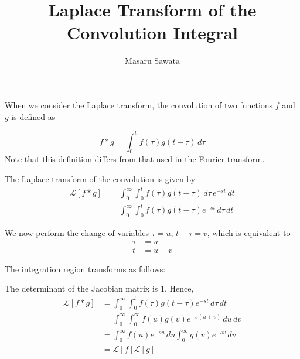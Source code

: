 \documentclass[letterpaper, 12pt]{article}
\title{Laplace Transform of the Convolution Integral}
\author{Masaru Sawata}
\theoremstyle{custom}
\begin{document}
\maketitle
When we consider the Laplace transform, the convolution of two functions $f$ and $g$ is defined as

\begin{equation*}
  f*g = \int_{0}^{t} f(\tau) g(t - \tau) \, d\tau
\end{equation*}
Note that this definition differs from that used in the Fourier transform.

The Laplace transform of the convolution is given by
\begin{align*}
  \mathcal{L} \left[ f*g \right] 
  &= \int_{0}^{\infty} \int_{0}^{t} f(\tau) g(t-\tau) \, d\tau \, e^{-st} \, dt \\
  &= \int_{0}^{\infty} \int_{0}^{t} f(\tau) g(t-\tau) e^{-st} \, d\tau  \, dt
\end{align*}

We now perform the change of variables $\tau = u$, $t - \tau = v$,
which is equivalent to
\begin{align*}
  \tau &= u \\
  t &= u + v
\end{align*}

The integration region transforms as follows:
\begin{center}
\end{center}

The determinant of the Jacobian matrix is 1.
Hence,
\begin{align*}
  \mathcal{L} \left[ f*g \right] 
  &= \int_{0}^{\infty} \int_{0}^{t} f(\tau) g(t-\tau) e^{-st} \, d\tau  \, dt \\
  &= \int_{0}^{\infty} \int_{0}^{\infty} f(u) g(v) e^{-s(u+v)} \, du  \, dv \\
  &= \int_{0}^{\infty} f(u) e^{-su} \, du \int_{0}^{\infty}  g(v) e^{-sv}  \, dv \\
  &= \mathcal{L} \left[ f \right] \mathcal{L} \left[ g \right] 
\end{align*}
\end{document}
